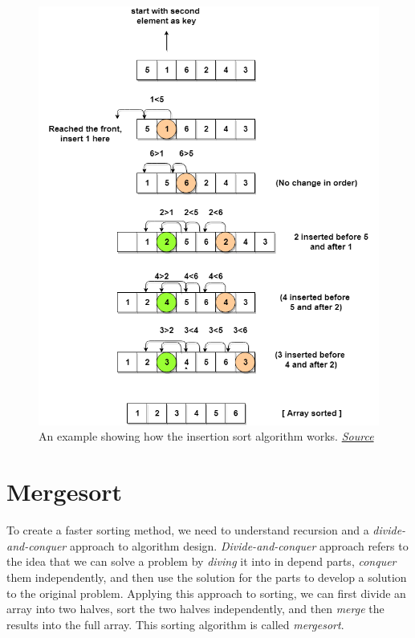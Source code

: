 \begin{figure}
    \centering
    \includegraphics[width=\textwidth]{lectures/images/insertion-sort.png}
    \caption{An example showing how the insertion sort algorithm works. \href{https://vivaharsha.com/product/verilog-implementation-of-insertion-sort-16-bits-and-5-inputs/}{\textit{Source}}}
    \label{fig:insertion_sort}
\end{figure}


\section{Mergesort}
To create a faster sorting method, we need to understand recursion and a \textit{divide-and-conquer} approach to algorithm design. \textit{Divide-and-conquer} approach refers to the idea that we can solve a problem by \textit{diving} it into in depend parts, \textit{conquer} them independently, and then use the solution for the parts to develop a solution to the original problem. Applying this approach to sorting, we can first divide an array into two halves, sort the two halves independently, and then \textit{merge} the results into the full array. This sorting algorithm is called \textit{mergesort}. 

